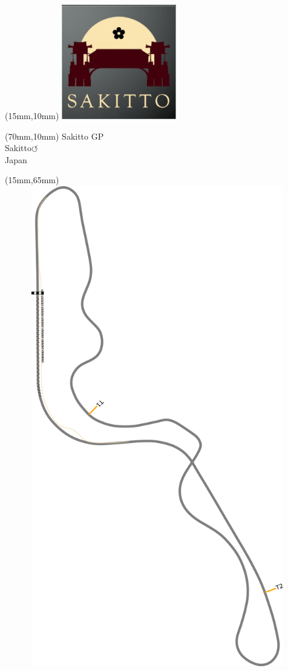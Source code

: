 \null\newpage
\begin{textblock*}{50mm}(15mm,10mm)%
\includegraphics[width=50mm]{LG/2015-05-20_00093.png}
\end{textblock*}
\begin{textblock*}{130mm}(70mm,10mm)%
{\fontsize{20}{20}\selectfont Sakitto GP\\}
{\fontsize{16}{16}\selectfont Sakitto\hfill \huge$\circlearrowleft$\\}
{\fontsize{12}{12}\selectfont Japan\\}
\end{textblock*}
\begin{textblock*}{185mm}(15mm,65mm)%
\centering
\mbox{\includegraphics[width=185mm,height=210mm,keepaspectratio]{PT/SAGP.pdf}}
\end{textblock*}
